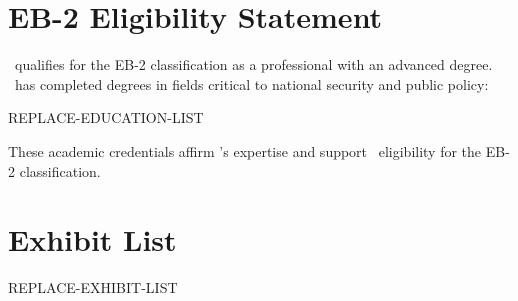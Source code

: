 \documentclass{pl_template}  %
\begin{document}
\section{EB-2 Eligibility Statement}
\Petitioner \  qualifies for the EB-2 classification as a professional with an advanced degree. \HeSheUp \ has completed degrees in fields critical to national security and public policy: 
\begin{itemize}
REPLACE-EDUCATION-LIST
\end{itemize}
These academic credentials affirm \Petitioner’s expertise and support \HisHerLow \ eligibility for the EB-2 classification.




\vspace{2em}

\section*{Exhibit List}
\begin{itemize}
REPLACE-EXHIBIT-LIST
\end{itemize}
 
\end{document}
